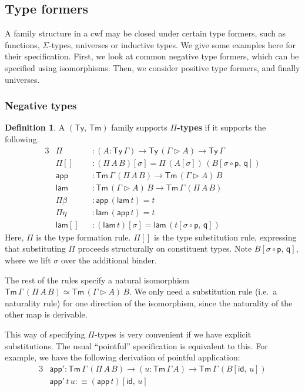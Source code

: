 \documentclass[12pt,a4paper,twoside,openany]{book}
\theoremstyle{remark}
\theoremstyle{definition}
\newtheorem{mydefinition}{Definition}
\theoremstyle{theorem}
\newcommand{\ms}[1]{\mathsf{#1}}
\newcommand{\id}{\mathsf{id}}
\newcommand{\Tm}{\mathsf{Tm}}
\newcommand{\Ty}{\mathsf{Ty}}
\newcommand{\ext}{\triangleright}
\newcommand{\p}{\mathsf{p}}
\newcommand{\q}{\mathsf{q}}
\newcommand{\app}{\ms{app}}
\newcommand{\lam}{\ms{lam}}
\newcommand{\defn}{:\equiv}
\begin{document}
\subsection{Type formers}
A family structure in a cwf may be closed under certain type formers, such as
functions, $\Sigma$-types, universes or inductive types. We give some examples
here for their specification. First, we look at common negative type formers,
which can be specified using isomorphisms. Then, we consider positive type
formers, and finally universes.

\subsubsection{Negative types}

\begin{mydefinition}
A $(\Ty,\,\Tm)$ family supports \textbf{$\Pi$-types} if it supports the following.
\begin{alignat*}{3}
  &\Pi           &&: (A : \Ty\,\Gamma) \to \Ty\,(\Gamma\ext A) \to \Ty\,\Gamma\\
  &\ms{\Pi[]}    &&: (\Pi\,A\,B)[\sigma] = \Pi\,(A[\sigma])\,(B[\sigma\circ\p,\,\q])\\
  &\app          &&: \Tm\,\Gamma\,(\Pi\,A\,B) \to \Tm\,(\Gamma \ext A)\,B\\
  &\lam          &&: \Tm\,(\Gamma \ext A)\,B \to \Tm\,\Gamma\,(\Pi\,A\,B)\\
  &\Pi\beta      &&: \app\,(\lam\,t) = t\\
  &\Pi\eta       &&: \lam\,(\app\,t) = t\\
  &\lam[]        &&: (\lam\,t)[\sigma] = \lam\,(t[\sigma\circ\p,\,\q])
\end{alignat*}
Here, $\Pi$ is the type formation rule. $\ms{\Pi[]}$ is the type substitution
rule, expressing that substituting $\Pi$ proceeds structurally on constituent
types.  Note $B[\sigma\circ\p,\,\q]$, where we lift $\sigma$ over the additional
binder.

The rest of the rules specify a natural isomorphism $\Tm\,\Gamma\,(\Pi\,A\,B)
\simeq \Tm\,(\Gamma \ext A)\,B$. We only need a substitution rule (i.e.\ a
naturality rule) for one direction of the isomorphism, since the naturality of
the other map is derivable.

This way of specifying $\Pi$-types is very convenient if we have explicit
substitutions. The usual ``pointful'' specification is equivalent to this. For
example, we have the following derivation of pointful application:
\begin{alignat*}{3}
  &\app' : \Tm\,\Gamma\,(\Pi\,A\,B) \to (u : \Tm\,\Gamma\,A) \to \Tm\,\Gamma\,(B[\id,\,u])\\
  &\app'\,t\,u \defn (\app\,t)[\id,\,u]
\end{alignat*}

\end{mydefinition}
\end{document}
